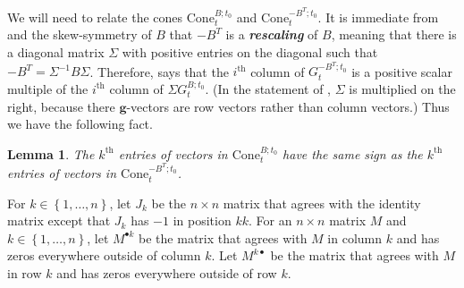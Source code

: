 \documentclass{amsart}
\newtheorem{lemma}[proposition]{Lemma}
\theoremstyle{definition}
\theoremstyle{remark}
\numberwithin{equation}{section}
\newcommand{\newword}[1]{\textbf{\emph{#1}}}
\newcommand{\set}[1]{{\left\lbrace #1 \right\rbrace}}
\renewcommand{\th}{^\text{th}}
\newcommand{\0}{{\mathbf{0}}}
\newcommand{\Cone}{\mathrm{Cone}}
\newcommand{\g}{\mathbf{g}}
\renewcommand{\th}{^\text{th}}
\begin{document}
We will need to relate the cones $\Cone^{B;t_0}_t$ and $\Cone^{-B^T;t_0}_t$.
It is immediate from \cite[Proposition~7.5]{universal} and the skew-symmetry of $B$ that $-B^T$ is a \newword{rescaling} of $B$, meaning that there is a diagonal matrix $\Sigma$ with positive entries on the diagonal such that $-B^T=\Sigma^{-1}B\Sigma$.
Therefore, \cite[Proposition~8.20]{universal} says that the $i\th$ column of $G_t^{-B^T;t_0}$ is a positive scalar multiple of the $i\th$ column of $\Sigma G_t^{B;t_0}$.
(In the statement of \cite[Proposition~8.20]{universal}, $\Sigma$ is multiplied on the right, because there $\g$-vectors are row vectors rather than column vectors.)
Thus we have the following fact.
\begin{lemma}\label{B or -BT}
The $k\th$ entries of vectors in $\Cone^{B;t_0}_t$ have the same sign as the $k\th$ entries of vectors in $\Cone^{-B^T;t_0}_t$.
\end{lemma}

For $k\in\set{1,\ldots,n}$, let $J_k$ be the $n\times n$ matrix that agrees with the identity matrix except that $J_k$ has $-1$ in position $kk$.
For an $n\times n$ matrix $M$ and $k\in\set{1,\ldots,n}$, let $M^{\bullet k}$ be the matrix that agrees with $M$ in column $k$ and has zeros everywhere outside of column $k$.
Let $M^{k\bullet}$ be the matrix that agrees with $M$ in row $k$ and has zeros everywhere outside of row $k$.
\end{document}
